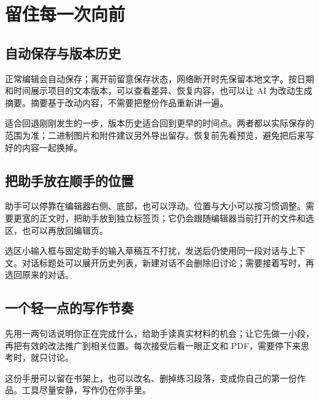 \section{留住每一次向前}
\subsection{自动保存与版本历史}
正常编辑会自动保存；离开前留意保存状态，网络断开时先保留本地文字。按日期和时间展示项目的文本版本，可以查看差异、恢复内容，也可以让 AI 为改动生成摘要。摘要基于改动内容，不需要把整份作品重新讲一遍。

适合回退刚刚发生的一步，版本历史适合回到更早的时间点。两者都以实际保存的范围为准；二进制图片和附件建议另外导出留存。恢复前先看预览，避免把后来写好的内容一起换掉。

\subsection{把助手放在顺手的位置}
助手可以停靠在编辑器右侧、底部，也可以浮动。位置与大小可以按习惯调整。需要更宽的正文时，把助手放到独立标签页；它仍会跟随编辑器当前打开的文件和选区，也可以再放回编辑页。

选区小输入框与固定助手的输入草稿互不打扰，发送后仍使用同一段对话与上下文。对话标题处可以展开历史列表，新建对话不会删除旧讨论；需要接着写时，再选回原来的对话。

\subsection{一个轻一点的写作节奏}
先用一两句话说明你正在完成什么，给助手读真实材料的机会；让它先做一小段，再把有效的改法推广到相关位置。每次接受后看一眼正文和 PDF，需要停下来思考时，就只讨论。

这份手册可以留在书架上，也可以改名、删掉练习段落，变成你自己的第一份作品。工具尽量安静，写作仍在你手里。
